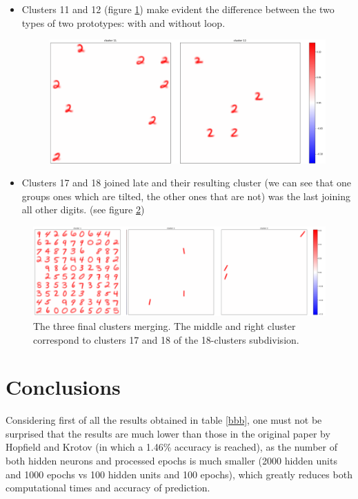 \documentclass[a4paper]{report}
\begin{document}
\begin{itemize}
    \item Clusters 11 and 12 (figure \ref{1112}) make evident the difference between the two types of two prototypes: with and without loop.

\begin{figure} [H]
    \centering
    \includegraphics [width=\textwidth ] {c/h/11.png}
    \caption{}
    \label{1112}
\end{figure}

    \item Clusters 17 and 18 joined late and their resulting cluster (we can see that one groups ones which are tilted, the other ones that are not) was the last joining all other digits. (see figure \ref{final})
\end{itemize}

\begin{figure} [H]
    \centering
    \includegraphics  [width=\textwidth]  {c/h/final1.png}
    \caption{The three final clusters merging. The middle and right cluster correspond to clusters 17 and 18 of the 18-clusters subdivision.}
    \label{final}
\end{figure}

\chapter{Conclusions}

Considering first of all the results obtained in table \ref{bbb}, one must not be surprised that the results are much lower than those in the original paper by Hopfield and Krotov (in which a 1.46\% accuracy is reached), as the number of both hidden neurons and processed epochs is much smaller (2000 hidden units and 1000 epochs vs 100 hidden units and 100 epochs), which greatly reduces both computational times and accuracy of prediction.
\end{document}
